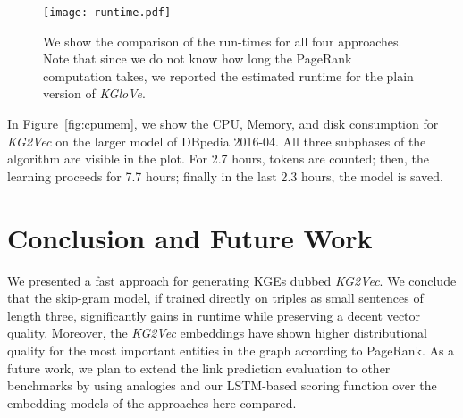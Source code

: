 \documentclass[graybox]{archivesofdatascience}
\newcommand{\ktvplain}{KG2Vec\xspace}
\newcommand{\ktv}{\textit{\ktvplain}\xspace}
\newcommand{\kgl}{\textit{KGloVe}\xspace}
\begin{document}
\begin{figure}[htbp]
    \sidecaption
    \texttt{[image: runtime.pdf]}
	\caption{We show the comparison of the run-times for all four approaches. Note that since we do not know how long the PageRank computation takes, we reported the estimated runtime for the plain version of \kgl.}
	\label{fig:runtime}
\end{figure}

In Figure~\ref{fig:cpumem}, we show the CPU, Memory, and disk consumption for \ktv on the larger model of DBpedia 2016-04.
All three subphases of the algorithm are visible in the plot.
For 2.7 hours, tokens are counted; then, the learning proceeds for 7.7 hours; finally in the last 2.3 hours, the model is saved.









\section{Conclusion and Future Work} \label{sec:conclusion}

We presented a fast approach for generating KGEs dubbed \ktv.
We conclude that the skip-gram model, if trained directly on triples as small sentences of length three, significantly gains in runtime while preserving a decent vector quality.
Moreover, the \ktv embeddings have shown higher distributional quality for the most important entities in the graph according to PageRank.
As a future work, we plan to extend the link prediction evaluation to other benchmarks by using analogies and our LSTM-based scoring function over the embedding models of the approaches here compared.



\FloatBarrier

{
\FloatBarrier

}
\end{document}
